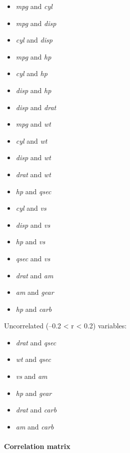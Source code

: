 \documentclass{article}
\begin{document}
\begin{itemize}
\item
  \emph{mpg} and \emph{cyl}
\item
  \emph{mpg} and \emph{disp}
\item
  \emph{cyl} and \emph{disp}
\item
  \emph{mpg} and \emph{hp}
\item
  \emph{cyl} and \emph{hp}
\item
  \emph{disp} and \emph{hp}
\item
  \emph{disp} and \emph{drat}
\item
  \emph{mpg} and \emph{wt}
\item
  \emph{cyl} and \emph{wt}
\item
  \emph{disp} and \emph{wt}
\item
  \emph{drat} and \emph{wt}
\item
  \emph{hp} and \emph{qsec}
\item
  \emph{cyl} and \emph{vs}
\item
  \emph{disp} and \emph{vs}
\item
  \emph{hp} and \emph{vs}
\item
  \emph{qsec} and \emph{vs}
\item
  \emph{drat} and \emph{am}
\item
  \emph{am} and \emph{gear}
\item
  \emph{hp} and \emph{carb}
\end{itemize}
Uncorrelated (--0.2 \textless{} r \textless{} 0.2) variables:

\begin{itemize}
\item
  \emph{drat} and \emph{qsec}
\item
  \emph{wt} and \emph{qsec}
\item
  \emph{vs} and \emph{am}
\item
  \emph{hp} and \emph{gear}
\item
  \emph{drat} and \emph{carb}
\item
  \emph{am} and \emph{carb}
\end{itemize}
\paragraph{Correlation matrix}
\end{document}
